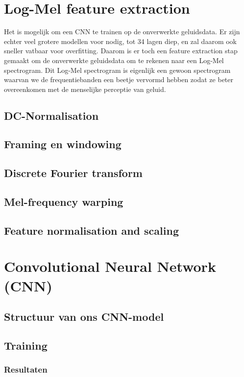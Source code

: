 \section{Log-Mel feature extraction}

Het is mogelijk om een CNN te trainen op de onverwerkte geluidsdata.
Er zijn echter veel grotere modellen voor nodig, tot 34 lagen diep, en zal daarom ook sneller vatbaar voor overfitting. \cite{IEEE:very-deep-cnn-raw-waveforms}
Daarom is er toch een feature extraction stap gemaakt om de onverwerkte geluidsdata om te rekenen naar een Log-Mel spectrogram.
Dit Log-Mel spectrogram is eigenlijk een gewoon spectrogram waarvan we de frequentiebanden een beetje vervormd hebben zodat ze beter overeenkomen met de menselijke perceptie van geluid. \cite{enwiki:mel-freq-cepstrum}


\subsection{DC-Normalisation}
\subsection{Framing en windowing}
\subsection{Discrete Fourier transform}
\subsection{Mel-frequency warping}
\subsection{Feature normalisation and scaling}

\section{Convolutional Neural Network (CNN)}

\subsection{Structuur van ons CNN-model}

\subsection{Training}
\subsubsection{Resultaten}



